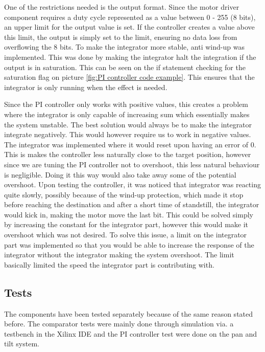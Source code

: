 One of the restrictions needed is the output format. Since the motor driver component requires a duty cycle represented as a value between 0 - 255 (8 bits), an upper limit for the output value is set. If the controller creates a value above this limit, the output is simply set to the limit, ensuring no data loss from overflowing the 8 bits.
To make the integrator more stable, anti wind-up was implemented. This was done by making the integrator halt the integration if the output is in saturation. This can be seen on the if statement checking for the saturation flag on picture \ref{fig:PI controller code example}. This ensures that the integrator is only running when the effect is needed.

Since the PI controller only works with positive values, this creates a problem where the integrator is only capable of increasing sum which essentially makes the system unstable. The best solution would always be to make the integrator integrate negatively. This would however require us to work in negative values. The integrator was implemented where it would reset upon having an error of 0. This is makes the controller less naturally close to the target position, however since we are tuning the PI controller not to overshoot, this less natural behaviour is negligible. Doing it this way would also take away some of the potential overshoot.
Upon testing the controller, it was noticed that integrator was reacting quite slowly, possibly because of the wind-up protection, which made it stop before reaching the destination and after a short time of standstill, the integrator would kick in, making the motor move the last bit. This could be solved simply by increasing the constant for the integrator part, however this would make it overshoot which was not desired. To solve this issue, a limit on the integrator part was implemented so that you would be able to increase the response of the integrator without the integrator making the system overshoot. The limit basically limited the speed the integrator part is contributing with.


\subsection{Tests}

The components have been tested separately because of the same reason stated before. The comparator tests were mainly done through simulation via. a testbench in the Xilinx IDE and the PI controller test were done on the pan and tilt system.


